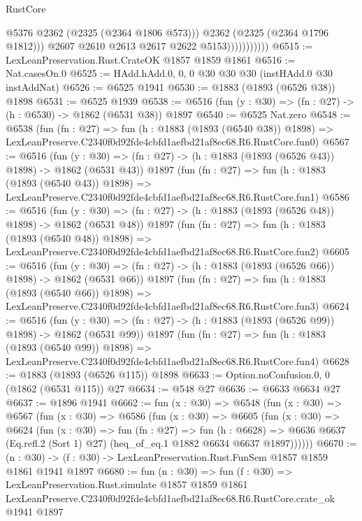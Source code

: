 \begin{lexlean}{RustCore}
\begin{coremodule}
                              @5376
                              @2362
                              (@2325 (@2364 @1806 @573)))
                            @2362
                            (@2325 (@2364 @1796 @1812)))
                          @2607
                          @2610
                          @2613
                          @2617
                          @2622
                          @5153)))))))))))
@6515 := LexLeanPreservation.Rust.CrateOK @1857 @1859 @1861
@6516 := Nat.casesOn.{0}
@6525 := HAdd.hAdd.{0, 0, 0} @30 @30 @30 (instHAdd.{0} @30 instAddNat)
@6526 := @6525 @1941
@6530 := @1883 (@1893 (@6526 @38)) @1898
@6531 := @6525 @1939
@6538 := @6516 (fun (y : @30) => (fn : @27) -> (h : @6530) -> @1862 (@6531 @38)) @1897
@6540 := @6525 Nat.zero
@6548 := @6538
    (fun (fn : @27) =>
    fun (h : @1883 (@1893 (@6540 @38)) @1898) =>
    LexLeanPreserve.C2340f0d92fde4cbfd1aefbd21af8ec68.R6.RustCore.fun0)
@6567 := @6516
    (fun (y : @30) => (fn : @27) -> (h : @1883 (@1893 (@6526 @43)) @1898) -> @1862 (@6531 @43))
    @1897
    (fun (fn : @27) =>
    fun (h : @1883 (@1893 (@6540 @43)) @1898) =>
    LexLeanPreserve.C2340f0d92fde4cbfd1aefbd21af8ec68.R6.RustCore.fun1)
@6586 := @6516
    (fun (y : @30) => (fn : @27) -> (h : @1883 (@1893 (@6526 @48)) @1898) -> @1862 (@6531 @48))
    @1897
    (fun (fn : @27) =>
    fun (h : @1883 (@1893 (@6540 @48)) @1898) =>
    LexLeanPreserve.C2340f0d92fde4cbfd1aefbd21af8ec68.R6.RustCore.fun2)
@6605 := @6516
    (fun (y : @30) => (fn : @27) -> (h : @1883 (@1893 (@6526 @66)) @1898) -> @1862 (@6531 @66))
    @1897
    (fun (fn : @27) =>
    fun (h : @1883 (@1893 (@6540 @66)) @1898) =>
    LexLeanPreserve.C2340f0d92fde4cbfd1aefbd21af8ec68.R6.RustCore.fun3)
@6624 := @6516
    (fun (y : @30) => (fn : @27) -> (h : @1883 (@1893 (@6526 @99)) @1898) -> @1862 (@6531 @99))
    @1897
    (fun (fn : @27) =>
    fun (h : @1883 (@1893 (@6540 @99)) @1898) =>
    LexLeanPreserve.C2340f0d92fde4cbfd1aefbd21af8ec68.R6.RustCore.fun4)
@6628 := @1883 (@1893 (@6526 @115)) @1898
@6633 := Option.noConfusion.{0, 0} (@1862 (@6531 @115)) @27
@6634 := @548 @27
@6636 := @6633 @6634 @27
@6637 := @1896 @1941
@6662 := fun (x : @30) =>
  @6548
    (fun (x : @30) =>
    @6567
      (fun (x : @30) =>
      @6586
        (fun (x : @30) =>
        @6605
          (fun (x : @30) =>
          @6624
            (fun (x : @30) =>
            fun (fn : @27) =>
            fun (h : @6628) =>
            @6636 @6637 (Eq.refl.{2} (Sort 1) @27) (heq_of_eq.{1} @1882 @6634 @6637 @1897))))))
@6670 := (n : @30) -> (f : @30) -> LexLeanPreservation.Rust.FunSem @1857 @1859 @1861 @1941 @1897
@6680 := fun (n : @30) =>
  fun (f : @30) =>
  LexLeanPreservation.Rust.simulate
    @1857
    @1859
    @1861
    LexLeanPreserve.C2340f0d92fde4cbfd1aefbd21af8ec68.R6.RustCore.crate_ok
    @1941
    @1897
\end{coremodule}
\end{lexlean}
